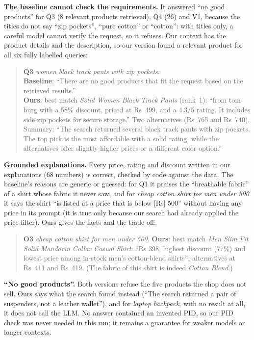 \documentclass[11pt,a4paper]{article}
\begin{document}
\textbf{The baseline cannot check the requirements.} It answered ``no good products'' for Q3 (8 relevant products
retrieved), Q4 (26) and V1, because the titles do not say ``zip pockets'', ``pure cotton'' or ``cotton'': with titles only,
a careful model cannot verify the request, so it refuses. Our context has the product details and the description, so our
version found a relevant product for all six fully labelled queries:

\begin{quote}\small
\textbf{Q3} \emph{women black track pants with zip pockets}.\\
\textbf{Baseline}: ``There are no good products that fit the request based on the retrieved results.''\\
\textbf{Ours}: best match \emph{Solid Women Black Track Pants} (rank~1): ``from tom burg with a 58\% discount, priced at
Rs~499, and a 4.3/5 rating. It includes side zip pockets for secure storage.'' Two alternatives (Rs~765 and Rs~740).
Summary: ``The search returned several black track pants with zip pockets. The top pick is the most affordable with a
solid rating, while the alternatives offer slightly higher prices or a different color option.''
\end{quote}

\textbf{Grounded explanations.} Every price, rating and discount written in our explanations (68 numbers) is correct,
checked by code against the data. The baseline's reasons are generic or guessed: for Q1 it praises the ``breathable
fabric'' of a shirt whose fabric it never saw, and for \emph{cheap cotton shirt for men under 500} it says the shirt ``is
listed at a price that is below [Rs] 500'' without having any price in its prompt (it is true only because our search had
already applied the price filter). Ours gives the facts and the trade-off:

\begin{quote}\small
\textbf{O3} \emph{cheap cotton shirt for men under 500}. \textbf{Ours}: best match \emph{Men Slim Fit Solid Mandarin
Collar Casual Shirt}: ``Rs 398, highest discount (77\%) and lowest price among in-stock men's cotton-blend shirts'';
alternatives at Rs~411 and Rs~419. (The fabric of this shirt is indeed \emph{Cotton Blend}.)
\end{quote}

\textbf{``No good products''.} Both versions refuse the five products the shop does not sell. Ours says what the search
found instead (``The search returned a pair of suspenders, not a leather wallet''), and for \emph{laptop backpack},
with no result at all, it does not call the LLM. No answer contained an invented PID, so our PID check was never needed in
this run; it remains a guarantee for weaker models or longer contexts.
\end{document}
